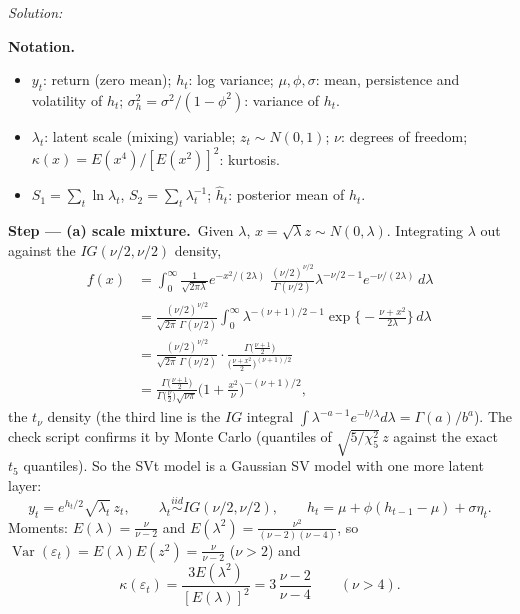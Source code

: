 \documentclass[11pt,a4paper]{article}
\newif\ifsolucoes
\newcommand{\espacoresol}{4.5cm}   %
\newenvironment{notacao}{\par\smallskip\noindent\textbf{Notation.}\begin{itemize}[leftmargin=1.4em,topsep=1pt,itemsep=0pt]\small}{\end{itemize}}
\newcommand{\resolespaco}{\ifsolucoes\else\par\textit{Solution:}\vspace{\espacoresol}\par\fi}
\newcommand{\passo}[2]{\par\smallskip\noindent\textbf{Step --- #1.}~#2}
\begin{document}
\resolespaco
\begin{sol}
\begin{notacao}
\item $y_t$: return (zero mean); $h_t$: log variance; $\mu,\phi,\sigma$: mean, persistence and volatility of $h_t$; $\sigma_h^2=\sigma^2/(1-\phi^2)$: variance of $h_t$.
\item $\lambda_t$: latent scale (mixing) variable; $z_t\sim N(0,1)$; $\nu$: degrees of freedom; $\kappa(x)=E(x^4)/[E(x^2)]^2$: kurtosis.
\item $S_1=\sum_t\ln\lambda_t$, $S_2=\sum_t\lambda_t^{-1}$; $\hat h_t$: posterior mean of $h_t$.
\end{notacao}

\passo{(a) scale mixture}{Given $\lambda$, $x=\sqrt\lambda z\sim N(0,\lambda)$. Integrating $\lambda$ out against the
$IG(\nu/2,\nu/2)$ density,}
\begin{align*}
f(x) &= \int_0^\infty \frac{1}{\sqrt{2\pi\lambda}}e^{-x^2/(2\lambda)}\;\frac{(\nu/2)^{\nu/2}}{\Gamma(\nu/2)}\lambda^{-\nu/2-1}e^{-\nu/(2\lambda)}\,d\lambda\\
&= \frac{(\nu/2)^{\nu/2}}{\sqrt{2\pi}\,\Gamma(\nu/2)}\int_0^\infty \lambda^{-(\nu+1)/2-1}\exp\!\Big\{-\frac{\nu+x^2}{2\lambda}\Big\}\,d\lambda\\
&= \frac{(\nu/2)^{\nu/2}}{\sqrt{2\pi}\,\Gamma(\nu/2)}\cdot\frac{\Gamma\big(\frac{\nu+1}{2}\big)}{\big(\frac{\nu+x^2}{2}\big)^{(\nu+1)/2}}\\
&= \frac{\Gamma\big(\frac{\nu+1}{2}\big)}{\Gamma\big(\frac{\nu}{2}\big)\sqrt{\nu\pi}}\Big(1+\frac{x^2}{\nu}\Big)^{-(\nu+1)/2},
\end{align*}
the $t_\nu$ density (the third line is the $IG$ integral $\int\lambda^{-a-1}e^{-b/\lambda}d\lambda=\Gamma(a)/b^a$). The
check script confirms it by Monte Carlo (quantiles of $\sqrt{5/\chi^2_5}\,z$ against the exact $t_5$ quantiles).
So the SVt model is a Gaussian SV model with one more latent layer:
\begin{equation}\label{svt:mix} y_t=e^{h_t/2}\sqrt{\lambda_t}\,z_t,\qquad \lambda_t\overset{iid}{\sim}IG(\nu/2,\nu/2),\qquad h_t=\mu+\phi(h_{t-1}-\mu)+\sigma\eta_t . \end{equation}
Moments: $E(\lambda)=\frac{\nu}{\nu-2}$ and $E(\lambda^2)=\frac{\nu^2}{(\nu-2)(\nu-4)}$, so
$\operatorname{Var}(\varepsilon_t)=E(\lambda)E(z^2)=\frac{\nu}{\nu-2}$ ($\nu>2$) and
\[ \kappa(\varepsilon_t)=\frac{3E(\lambda^2)}{[E(\lambda)]^2}=3\,\frac{\nu-2}{\nu-4}\qquad(\nu>4). \]


\end{sol}
\end{document}
